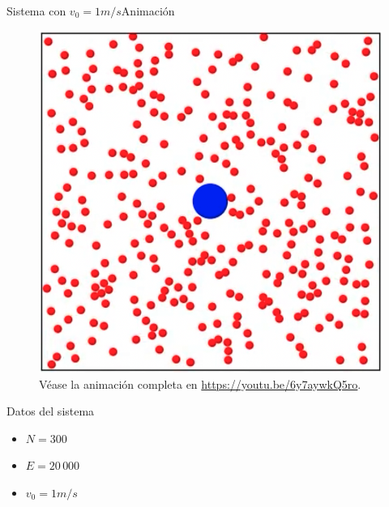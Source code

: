 \documentclass{beamer}
\begin{document}
            \begin{frame}{Sistema con $v_0=1m/s$}{Animación}
                \begin{minipage}[t]{0.60\textwidth}
                    \begin{figure}[H!]
                        \includegraphics[height=.65\textheight]{./animation_obstacle_still_v_1}
                        \caption*{Véase la animación completa en \url{https://youtu.be/6y7aywkQ5ro}.}
                        \label{fig:a_1}
                    \end{figure}
                \end{minipage}
                \hfill
                \begin{minipage}[t]{0.30\textwidth}
                    \begin{block}{Datos del sistema}
                        \begin{itemize}
                            \item $N=300$
                            \item $E=20\,000$
                            \item $v_0 = 1 m/s$
                        \end{itemize}
                    \end{block}
                \end{minipage}
            \end{frame}
\end{document}
